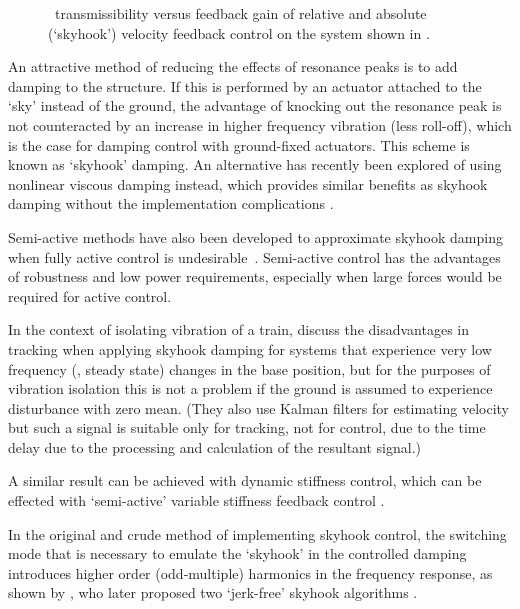 \begin{figure}
   \caption{\RMS\ transmissibility versus feedback gain of relative and 
   absolute (`skyhook') velocity feedback control on the system shown in 
   .}
\end{figure}


An attractive method of reducing the effects of resonance peaks is to add damping to the structure.
If this is performed by an actuator attached to the `sky' instead of the ground, the advantage of knocking out the resonance peak is not counteracted by an increase in higher frequency vibration (less roll-off), which is the case for damping control with ground-fixed actuators.
This scheme is known as `skyhook' damping.
An alternative has recently been explored of using nonlinear viscous damping instead, which provides similar benefits as skyhook damping without the implementation complications \cite{lang2009}.

Semi-active methods have also been developed to approximate skyhook damping when fully active control is undesirable~\cite{liu2002,liu2005,ahmadian2004}.
Semi-active control has the advantages of robustness and low power requirements, especially when large forces would be required for active control.

In the context of isolating vibration of a train, \textcite{li1999} discuss the disadvantages in tracking when applying skyhook damping for systems that experience very low frequency (\ie, steady state) changes in the base position, but for the purposes of vibration isolation this is not a problem if the ground is assumed to experience disturbance with zero mean.
(They also use Kalman filters for estimating velocity but such a signal is suitable only for tracking, not for control, due to the time delay due to the processing and calculation of the resultant signal.)

A similar result  can be achieved with dynamic stiffness control, which can be effected with `semi-active' variable stiffness feedback control \cite{leavitt2007}.

In the original and crude method of implementing skyhook control, the switching mode that is necessary to emulate the `skyhook' in the controlled damping introduces higher order (odd-multiple) harmonics in the frequency response, as shown by \textcite{ahmadian2001}, who later proposed two `jerk-free' skyhook algorithms \cite{ahmadian2004}.

